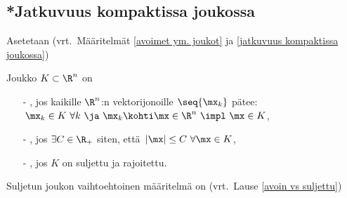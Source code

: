 \subsection{*Jatkuvuus kompaktissa joukossa}

Asetetaan (vrt.\ Määritelmät \ref{avoimet ym. joukot} ja \ref{jatkuvuus kompaktissa joukossa})
\begin{Def} \label{kompakti joukko - Rn} Joukko $K\subset\R^n$ on
\begin{itemize}  
\item[-] , jos kaikille $\R^n$:n vektorijonoille $\seq{\mx_k}$ pätee: \newline
         $\,\mx_k \in K\ \forall k\ \ja\ \mx_k \kohti \mx\in\R^n\ \impl\ \mx \in K$,
\item[-] , jos $\exists C\in\R_+$ siten, että 
         $\,|\mx| \le C\ \forall \mx \in K$,
\item[-] , jos $K$ on suljettu ja rajoitettu.
\end{itemize}
\end{Def}
Suljetun joukon vaihtoehtoinen määritelmä on (vrt.\ Lause \ref{avoin vs suljettu})

